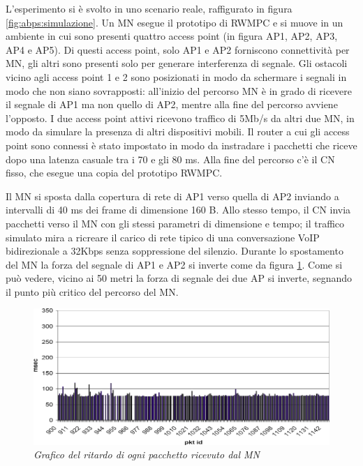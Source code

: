 \documentclass[12pt,a4paper,openright,twoside]{book}
\begin{document}
L'esperimento si è svolto in uno scenario reale, raffigurato in figura
\ref{fig:abps:simulazione}. Un MN esegue il prototipo di RWMPC e si
muove in un ambiente in cui sono presenti quattro access point (in
figura AP1, AP2, AP3, AP4 e AP5). Di questi access point, solo AP1 e
AP2 forniscono connettività per MN, gli altri sono presenti solo per
generare interferenza di segnale. Gli ostacoli vicino agli access
point 1 e 2 sono posizionati in modo da schermare i segnali in modo
che non siano sovrapposti: all'inizio del percorso MN è in grado di
ricevere il segnale di AP1 ma non quello di AP2, mentre alla fine del
percorso avviene l'opposto. I due access point attivi ricevono
traffico di 5Mb/s da altri due MN, in modo da simulare la presenza di
altri dispositivi mobili. Il router a cui gli access point sono
connessi è stato impostato in modo da instradare i pacchetti che
riceve dopo una latenza casuale tra i 70 e gli 80 ms. Alla fine del
percorso c'è il CN fisso, che esegue una copia del prototipo RWMPC.

Il MN si sposta dalla copertura di rete di AP1 verso quella di AP2
inviando a intervalli di 40 ms dei frame di dimensione 160 B. Allo
stesso tempo, il CN invia pacchetti verso il MN con gli stessi
parametri di dimensione e tempo; il traffico simulato mira a ricreare
il carico di rete tipico di una conversazione VoIP bidirezionale a
32Kbps senza soppressione del silenzio. Durante lo spostamento del MN
la forza del segnale di AP1 e AP2 si inverte come da figura
\ref{fig:abps:delay-mn}. Come si può vedere, vicino ai 50 metri la
forza di segnale dei due AP si inverte, segnando il punto più critico
del percorso del MN.

\begin{figure}
  \centering
  \includegraphics[width=\textwidth]{img/abps-delay-mn}
  \caption{\em Grafico del ritardo di ogni pacchetto ricevuto dal MN}
  \label{fig:abps:delay-mn}
\end{figure}
\end{document}
